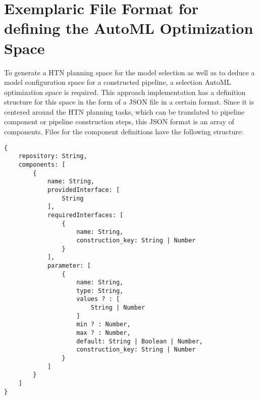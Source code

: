 \section{Exemplaric File Format for defining the AutoML Optimization Space}
\label{sec:implementation:json}
To generate a HTN planning space for the model selection as well as to deduce a model configuration space for a constructed pipeline, a selection AutoML optimization space is required.
This approach implementation has a definition structure for this space in the form of a JSON file in a certain format.\newline
Since it is centered around the HTN planning tasks, which can be translated to pipeline component or pipeline construction steps, this JSON format is an array of components.
Files for the component definitions have the following structure:
\begin{verbatim}
{
    repository: String,
    components: [
        {
            name: String,
            providedInterface: [
                String
            ],
            requiredInterfaces: [
                {
                    name: String,
                    construction_key: String | Number
                }
            ],
            parameter: [
                {
                    name: String,
                    type: String,
                    values ? : [
                        String | Number
                    ]
                    min ? : Number,
                    max ? : Number,
                    default: String | Boolean | Number,
                    construction_key: String | Number
                }
            ]
        }
    ]
}
\end{verbatim}

